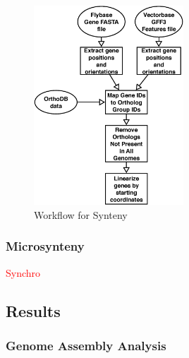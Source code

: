 \begin{figure}[H]
  \centering
  \includegraphics[width=0.5\textwidth]{figures/synteny/orthodb_dotplot_workflow}
  \caption{Workflow for Synteny}
  \label{fig:synteny-workflow}
\end{figure}

\subsubsection{Microsynteny}
\textcolor{red}{Synchro}

\subsection{Results}

\subsubsection{Genome Assembly Analysis}

